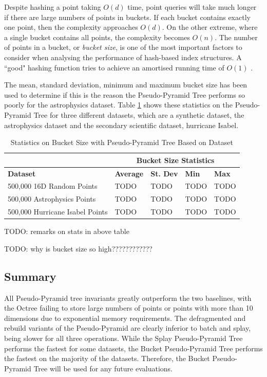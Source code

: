 Despite hashing a point taking $O(d)$ time, point queries will take much longer if there are large numbers of points in buckets. If each bucket contains exactly one point, then the complexity approaches $O(d)$. On the other extreme, where a single bucket contains all points, the complexity becomes $O(n)$. The number of points in a bucket, or \textit{bucket size}, is one of the most important factors to consider when analysing the performance of hash-based index structures. A ``good" hashing function tries to achieve an amortised running time of $O(1)$ \cite{TODO}.

The mean, standard deviation, minimum and maximum bucket size has been used to determine if this is the reason the Pseudo-Pyramid Tree performs so poorly for the astrophysics dataset. Table \ref{tab:perf1-bucket-stats} shows these statistics on the Pseudo-Pyramid Tree for three different datasets, which are a synthetic dataset, the astrophysics dataset and the secondary scientific dataset, hurricane Isabel.

\begin{table}
	\centering
	\begin{tabular}{|l|l|l|l|l|}
		\hline
		\textbf{} & \multicolumn{4}{c|}{\textbf{Bucket Size Statistics}} \\
		\hline
		\textbf{Dataset} & \textbf{Average} & \textbf{St. Dev} & \textbf{Min} & \textbf{Max} \\
		\hline
		500,000 16D Random Points & TODO & TODO & TODO & TODO \\
		500,000 Astrophysics Points & TODO & TODO & TODO & TODO \\
		500,000 Hurricane Isabel Points & TODO & TODO & TODO & TODO \\
		\hline
	\end{tabular}
	\caption{Statistics on Bucket Size with Pseudo-Pyramid Tree Based on Dataset}
	\label{tab:perf1-bucket-stats}
\end{table}

TODO: remarks on stats in above table

TODO: why is bucket size so high????????????

\subsection{Summary}

All Pseudo-Pyramid tree invariants greatly outperform the two baselines, with the Octree failing to store large numbers of points or points with more than 10 dimensions due to exponential memory requirements. The defragmented and rebuild variants of the Pseudo-Pyramid are clearly inferior to batch and splay, being slower for all three operations. While the Splay Pseudo-Pyramid Tree performs the fastest for some datasets, the Bucket Pseudo-Pyramid Tree performs the fastest on the majority of the datasets. Therefore, the Bucket Pseudo-Pyramid Tree will be used for any future evaluations.

